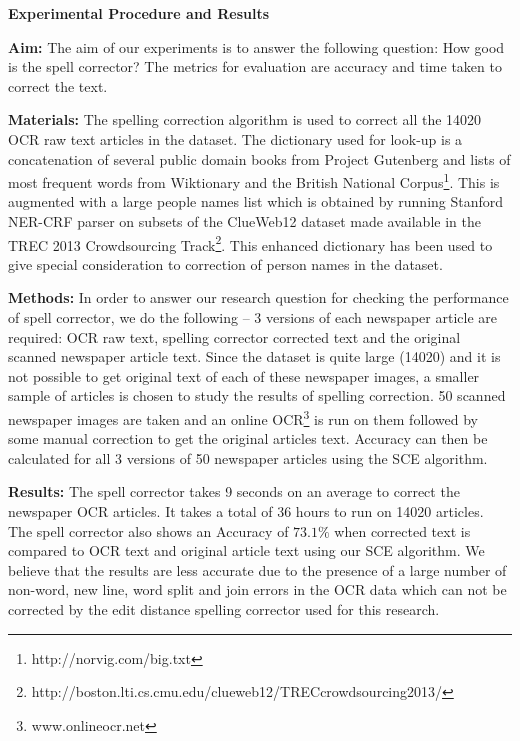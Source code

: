 \documentclass[12pt]{article}
\begin{document}
\noindent \textbf{Experimental Procedure and Results}

\noindent \textbf{Aim: }The aim of our experiments is to answer the following question:
How good is the spell corrector? The metrics for evaluation are accuracy and time taken to correct the text.


\noindent \textbf{Materials: }The spelling correction algorithm is used to correct all the 14020 OCR raw text articles in the dataset. The dictionary used for look-up is a concatenation of several public domain books from Project Gutenberg and lists of most frequent words from Wiktionary and the British National Corpus\footnote{http://norvig.com/big.txt}. This is augmented with a large people names list which is obtained  by running Stanford NER-CRF parser on subsets of the ClueWeb12 dataset made available in the TREC 2013 Crowdsourcing Track\footnote{http://boston.lti.cs.cmu.edu/clueweb12/TRECcrowdsourcing2013/}. This enhanced dictionary has been used to give special consideration to correction of person names in the dataset.

\noindent \textbf{Methods: }In order to answer our research question for checking the performance of spell corrector, we do the following -- 3 versions of each newspaper article are required: OCR raw text, spelling corrector corrected text and the original scanned newspaper article text. Since the dataset is quite large (14020) and it is not possible to get original text of each of these newspaper images, a smaller sample of articles is chosen to study the results of spelling correction. 50 scanned newspaper images are taken and an online OCR\footnote{www.onlineocr.net} is run on them followed by some manual correction to get the original articles text. Accuracy can then be calculated for all 3 versions of 50 newspaper articles using the SCE algorithm. 

\noindent \textbf{Results: }
The spell corrector takes 9 seconds on an average to correct the newspaper OCR articles. It takes a total of 36 hours to run on 14020 articles.
The spell corrector also shows an Accuracy of $73.1 \%$  when corrected text is compared to OCR text and original article text using our SCE algorithm. We believe that the results are less accurate due to the presence of a large number of non-word, new line, word split and join errors in the OCR data which can not be corrected by the edit distance spelling corrector used for this research. 
\end{document}

